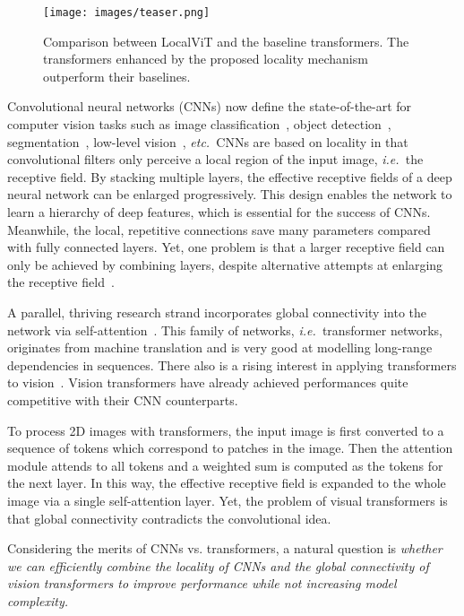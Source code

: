 \documentclass[10pt,twocolumn,letterpaper]{article}
\def\ie{\emph{i.e.\ }}
\def\etc{\emph{etc.\ }}
\begin{document}
\begin{figure}
    \centering
    \texttt{[image: images/teaser.png]}
    \caption{Comparison between LocalViT and the baseline transformers. The transformers enhanced by the proposed locality mechanism outperform their baselines.}
    \label{fig:teaser}
\end{figure}


Convolutional neural networks (CNNs) now define the state-of-the-art for computer vision tasks such as image classification~\cite{krizhevsky2012imagenet,simonyan2014very,he2016deep,huang2017densely}, object detection~\cite{girshick2014rich,ren2015faster}, segmentation~\cite{long2015fully,he2017mask}, low-level vision~\cite{dong2014learning,zhang2017beyond}, \etc CNNs are based on locality in that convolutional filters only perceive a local region of the input image, \ie the receptive field. By  stacking multiple layers, the effective receptive fields of a deep neural network can be enlarged progressively. This design enables the network to learn a hierarchy of deep features, which is essential for the success of CNNs. Meanwhile, the local, repetitive connections save many parameters compared with fully connected layers.
Yet, one problem is that a larger receptive field can only be achieved by combining layers, despite alternative attempts at enlarging the receptive field~\cite{yu2015multi}.

A parallel, thriving research strand incorporates global connectivity into the network via self-attention~\cite{vaswani2017attention,wang2020hat,mehta2020delight,wu2020lite}. This family of networks, \ie transformer networks, originates from machine translation and is very good at modelling long-range dependencies in sequences. There also is a rising interest in applying transformers to vision~\cite{carion2020end,dosovitskiy2020image,touvron2020training}. Vision transformers have already achieved performances quite competitive with their CNN counterparts. 

To process 2D images with transformers, the input image is first converted to a sequence of tokens which correspond to patches in the image. Then the attention module attends to all tokens and a weighted sum is computed as the tokens for the next layer.
In this way, the effective receptive field is expanded to the whole image via a single self-attention layer. Yet, the problem of visual transformers is that global connectivity contradicts the convolutional idea.

Considering the merits of CNNs vs. transformers, a natural question is \textit{whether we can efficiently combine the locality of CNNs and the global connectivity of vision transformers to improve performance while not increasing model complexity.} 
\end{document}
